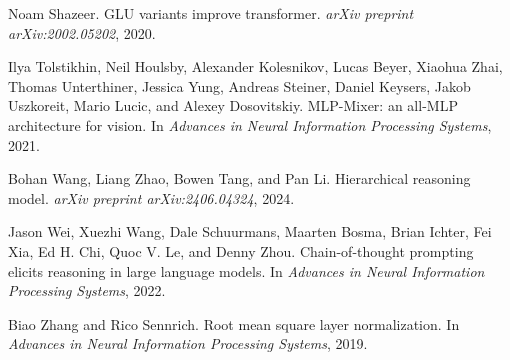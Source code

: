 \documentclass{article}
\begin{document}
\begin{thebibliography}{}
Noam Shazeer.
GLU variants improve transformer.
\textit{arXiv preprint arXiv:2002.05202}, 2020.

Ilya Tolstikhin, Neil Houlsby, Alexander Kolesnikov, Lucas Beyer, Xiaohua Zhai, Thomas Unterthiner, Jessica Yung, Andreas Steiner, Daniel Keysers, Jakob Uszkoreit, Mario Lucic, and Alexey Dosovitskiy.
MLP-Mixer: an all-MLP architecture for vision.
In \textit{Advances in Neural Information Processing Systems}, 2021.

Bohan Wang, Liang Zhao, Bowen Tang, and Pan Li.
Hierarchical reasoning model.
\textit{arXiv preprint arXiv:2406.04324}, 2024.

Jason Wei, Xuezhi Wang, Dale Schuurmans, Maarten Bosma, Brian Ichter, Fei Xia, Ed H. Chi, Quoc V. Le, and Denny Zhou.
Chain-of-thought prompting elicits reasoning in large language models.
In \textit{Advances in Neural Information Processing Systems}, 2022.

Biao Zhang and Rico Sennrich.
Root mean square layer normalization.
In \textit{Advances in Neural Information Processing Systems}, 2019.

\end{thebibliography}
\end{document}
